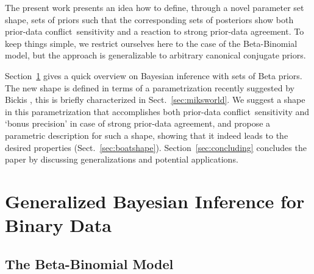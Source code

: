 \documentclass[runningheads,a4paper]{llncs}
\def\pdc{prior-data conflict}
\begin{document}
The present work presents an idea how to define, through a novel parameter set shape,
sets of priors such that the corresponding sets of posteriors
show both \pdc\ sensitivity and a reaction to strong prior-data agreement.
To keep things simple, we restrict ourselves here to the case of the Beta-Binomial model, %
but the approach is generalizable to arbitrary canonical conjugate priors.

Section~\ref{sec:genbayes} gives a quick overview on Bayesian inference with sets of Beta priors. 
The new shape is defined in terms of a parametrization
recently suggested by Bickis \cite{2015:mik-isipta},
this is briefly characterized in Sect.~\ref{sec:miksworld}.
We suggest a shape in this parametrization that accomplishes
both \pdc\ sensitivity and `bonus precision' in case of strong prior-data agreement,
and propose a parametric description for such a shape,
showing that it indeed leads to the desired properties (Sect.~\ref{sec:boatshape}).
Section~\ref{sec:concluding} concludes the paper by discussing generalizations and potential applications. 


\section{Generalized Bayesian Inference for Binary Data}
\label{sec:genbayes}

\iffalse
\subsection{The Beta-Binomial Model}
\label{sec:beta-binom}
\end{document}
